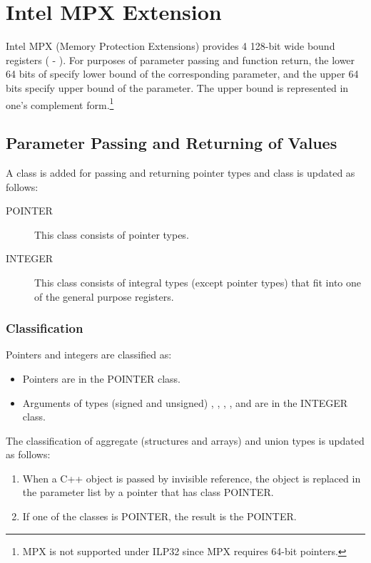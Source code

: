 \chapter{Intel MPX Extension}

Intel MPX (Memory Protection Extensions) provides 4 128-bit wide bound
registers ( - ).  For purposes of parameter passing
and function return, the lower 64 bits of  specify lower bound
of the corresponding parameter, and the upper 64 bits specify upper bound
of the parameter.  The upper bound is represented in one's complement
form.\footnote{MPX is not supported under ILP32 since MPX requires 64-bit
pointers.}

\section{Parameter Passing and Returning of Values}
\label{mpx-calling-conventions}

A  class is added for passing and returning pointer types
and  class is updated as follows:

\begin{description}
\item[POINTER] This class consists of pointer types.
\item[INTEGER] This class consists of integral types (except pointer types)
  that fit into one of the general purpose registers.
\end{description}

\subsection{Classification}

Pointers and integers are classified as:

\begin{itemize}
\item Pointers are in the POINTER class.
\item Arguments of types (signed and unsigned) , ,
  , ,  and 
  are in the INTEGER class.
\end{itemize}

The classification of aggregate (structures and arrays) and union
types is updated as follows:

\begin{enumerate}
\item When a C++ object is passed by invisible reference, the object is
      replaced in the parameter list by a pointer that has class POINTER.
\item If one of the classes is POINTER, the result is the POINTER.
\end{enumerate}

